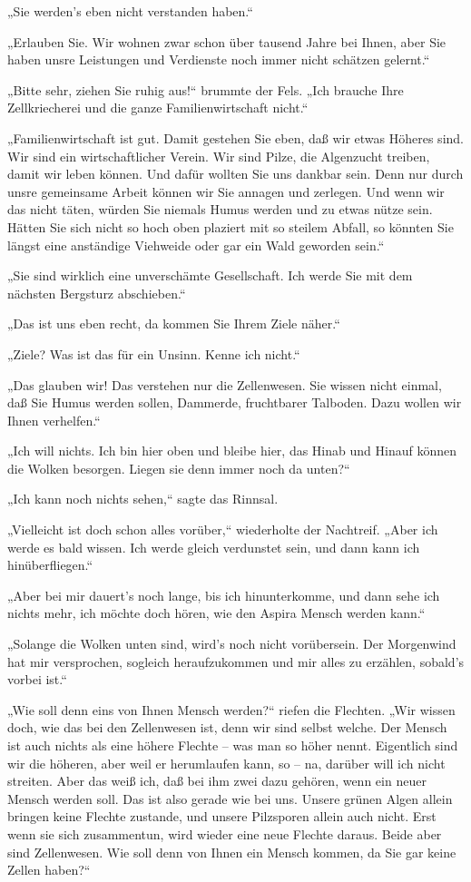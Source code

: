„Sie werden's eben nicht verstanden haben.“

„Erlauben Sie. Wir wohnen zwar schon über tausend Jahre bei Ihnen,
aber Sie haben unsre Leistungen und Verdienste noch immer nicht
schätzen gelernt.“

„Bitte sehr, ziehen Sie ruhig aus!“ brummte der Fels. „Ich brauche
Ihre Zellkriecherei und die ganze Familienwirtschaft nicht.“

„Familienwirtschaft ist gut. Damit gestehen Sie eben, daß wir etwas
Höheres sind. Wir sind ein wirtschaftlicher Verein. Wir sind Pilze,
die Algenzucht treiben, damit wir leben können. Und dafür wollten
Sie uns dankbar sein. Denn nur durch unsre gemeinsame Arbeit können
wir Sie annagen und zerlegen. Und wenn wir das nicht täten, würden
Sie niemals Humus werden und zu etwas nütze sein. Hätten Sie sich
nicht so hoch oben plaziert mit so steilem Abfall, so könnten Sie
längst eine anständige Viehweide oder gar ein Wald geworden sein.“

„Sie sind wirklich eine unverschämte Gesellschaft. Ich werde Sie
mit dem nächsten Bergsturz abschieben.“

„Das ist uns eben recht, da kommen Sie Ihrem Ziele näher.“

„Ziele? Was ist das für ein Unsinn. Kenne ich nicht.“

„Das glauben wir! Das verstehen nur die Zellenwesen. Sie wissen
nicht einmal, daß Sie Humus werden sollen, Dammerde, fruchtbarer
Talboden. Dazu wollen wir Ihnen verhelfen.“

„Ich will nichts. Ich bin hier oben und bleibe hier, das Hinab und
Hinauf können die Wolken besorgen. Liegen sie denn immer noch da
unten?“

„Ich kann noch nichts sehen,“ sagte das Rinnsal.

„Vielleicht ist doch schon alles vorüber,“ wiederholte der
Nachtreif. „Aber ich werde es bald wissen. Ich werde gleich
verdunstet sein, und dann kann ich hinüberfliegen.“

„Aber bei mir dauert's noch lange, bis ich hinunterkomme, und dann
sehe ich nichts mehr, ich möchte doch hören, wie den Aspira Mensch
werden kann.“

„Solange die Wolken unten sind, wird's noch nicht vorübersein. Der
Morgenwind hat mir versprochen, sogleich heraufzukommen und mir
alles zu erzählen, sobald's vorbei ist.“

„Wie soll denn eins von Ihnen Mensch werden?“ riefen die Flechten.
„Wir wissen doch, wie das bei den Zellenwesen ist, denn wir sind
selbst welche. Der Mensch ist auch nichts als eine höhere Flechte –
was man so höher nennt. Eigentlich sind wir die höheren, aber weil
er herumlaufen kann, so – na, darüber will ich nicht streiten. Aber
das weiß ich, daß bei ihm zwei dazu gehören, wenn ein neuer Mensch
werden soll. Das ist also gerade wie bei uns. Unsere grünen Algen
allein bringen keine Flechte zustande, und unsere Pilzsporen allein
auch nicht. Erst wenn sie sich zusammentun, wird wieder eine neue
Flechte daraus. Beide aber sind Zellenwesen. Wie soll denn von
Ihnen ein Mensch kommen, da Sie gar keine Zellen haben?“

